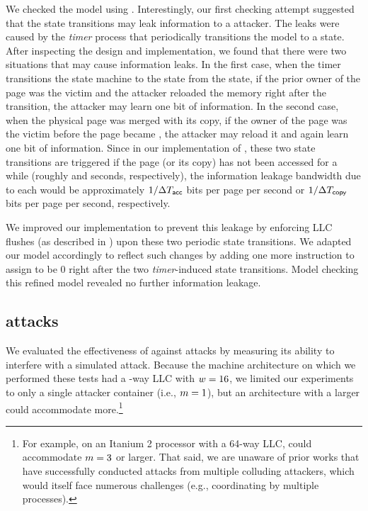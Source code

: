   We checked the model using
\spin. Interestingly, our first checking attempt suggested that
the state transitions may leak information to a \flushreload
attacker. The leaks were caused by the \textit{timer} process that
periodically transitions the model to a \shared state. After
inspecting the design and implementation, we found that there were two
situations that may cause information leaks.  In the first case, when
the timer transitions the state machine to the \shared state from the
\accessed state, if the prior owner of the page was the victim and the
attacker reloaded the memory right after the transition, the attacker
may learn one bit of information. In the second case, when the
physical page was merged with its copy, if the owner of the page was
the victim before the page became \shared, the attacker may reload it
and again learn one bit of information.  Since in our implementation
of \cachebar, these two state transitions are triggered if the page (or
its copy) has not been accessed for a while (roughly \accessedTimeout
and \copyTimeout seconds, respectively), the information leakage
bandwidth due to each would be approximately $1/\Delta{T}_{\mathsf{acc}}$ bits
per page per second or $1/\Delta{T}_{\mathsf{copy}}$ bits per page per second,
respectively.

We improved our \cachebar implementation to prevent this leakage by
enforcing \gls{LLC} flushes (as described in ) upon
these two periodic state transitions.  We adapted our model
accordingly to reflect such changes by adding one more instruction to
assign  to be $0$ right after the two
\textit{timer}-induced state transitions.  Model checking this refined
model revealed no further information leakage.

\subsection{\primeprobe attacks}
\label{cachebar:sec:eval:security:primeprobe}

We evaluated the effectiveness of \cachebar against \primeprobe attacks
by measuring its ability to interfere with a simulated attack.
Because the machine architecture on which we performed these tests had
a \cacheLineNmbr-way \gls{LLC} with $w=16$, we limited our
experiments to only a single attacker container (i.e.,
$m=1$), but an architecture with a larger \cacheLineNmbr
could accommodate more.\footnote{For example, on an Itanium 2
processor with a 64-way \gls{LLC}, \cachebar could accommodate $m
= 3$ or larger.  That said, we are unaware of prior works that have
successfully conducted \primeprobe attacks from multiple colluding
attackers, which would itself face numerous challenges (e.g.,
coordinating  by multiple processes).}

